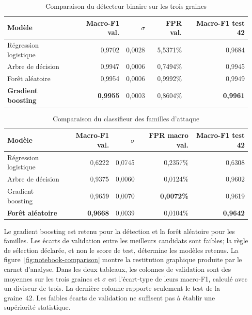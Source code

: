 \begin{table}[htbp]
  \centering
  \caption{Comparaison du d\'etecteur binaire sur les trois graines}
  \label{tab:binary-comparison}
  \renewcommand{\arraystretch}{1.15}
  \begin{tabularx}{\textwidth}{@{}Yrrrr@{}}
    \toprule
    Mod\`ele & Macro-F1 val. & $\sigma$ & FPR val. & Macro-F1 test 42 \\
    \midrule
    R\'egression logistique & 0,9702 & 0,0028 & 5,5371\% & 0,9684 \\
    Arbre de d\'ecision & 0,9947 & 0,0006 & 0,7494\% & 0,9945 \\
    For\^et al\'eatoire & 0,9954 & 0,0006 & 0,9992\% & 0,9949 \\
    \textbf{Gradient boosting} & \textbf{0,9955} & 0,0003 & 0,8604\% & \textbf{0,9961} \\
    \bottomrule
  \end{tabularx}
\end{table}

\begin{table}[htbp]
  \centering
  \caption{Comparaison du classifieur des familles d'attaque}
  \label{tab:multiclass-comparison}
  \renewcommand{\arraystretch}{1.15}
  \begin{tabularx}{\textwidth}{@{}Yrrrr@{}}
    \toprule
    Mod\`ele & Macro-F1 val. & $\sigma$ & FPR macro val. & Macro-F1 test 42 \\
    \midrule
    R\'egression logistique & 0,6222 & 0,0745 & 0,2357\% & 0,6308 \\
    Arbre de d\'ecision & 0,9375 & 0,0060 & 0,0124\% & 0,9602 \\
    Gradient boosting & 0,9659 & 0,0070 & \textbf{0,0072\%} & 0,9619 \\
    \textbf{For\^et al\'eatoire} & \textbf{0,9668} & 0,0039 & 0,0104\% & \textbf{0,9642} \\
    \bottomrule
  \end{tabularx}
\end{table}

Le gradient boosting est retenu pour la d\'etection et la for\^et al\'eatoire pour
les familles. Les écarts de validation entre les meilleurs candidats sont
faibles; la r\`egle de s\'election d\'eclar\'ee, et non le score de test, d\'etermine
les modèles retenus. La figure~\ref{fig:notebook-comparison} montre la restitution
graphique produite par le carnet d'analyse. Dans les deux tableaux, les
colonnes de validation sont des moyennes sur les trois graines et $\sigma$ est
l'écart-type de leurs macro-F1, calculé avec un diviseur de trois. La dernière
colonne rapporte seulement le test de la graine~42. Les faibles écarts de
validation ne suffisent pas à établir une supériorité statistique.

